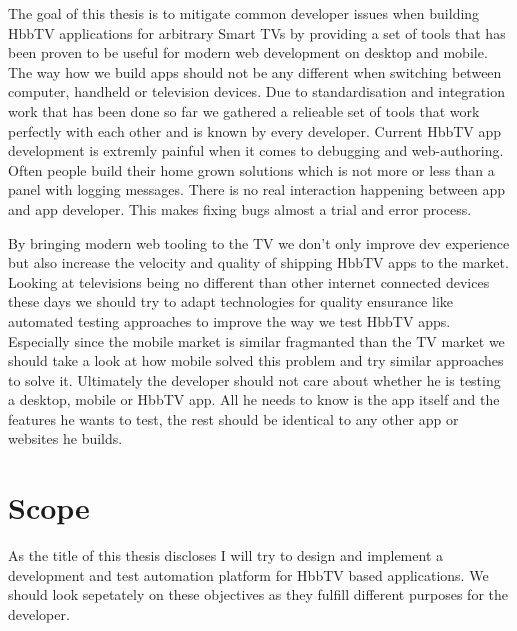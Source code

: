 The goal of this thesis is to mitigate common developer issues when building HbbTV applications for arbitrary
Smart TVs by providing a set of tools that has been proven to be useful for modern web development on desktop
and mobile. The way how we build apps should not be any different when switching between computer, handheld or
television devices. Due to standardisation and integration work that has been done so far we gathered a relieable
set of tools that work perfectly with each other and is known by every developer. Current HbbTV app development
is extremly painful when it comes to debugging and web-authoring. Often people build their home grown solutions
which is not more or less than a panel with logging messages. There is no real interaction happening between app
and app developer. This makes fixing bugs almost a trial and error process.

By bringing modern web tooling to the TV we don't only improve dev experience but also increase the velocity
and quality of shipping HbbTV apps to the market. Looking at televisions being no different than other internet
connected devices these days we should try to adapt technologies for quality ensurance like automated testing
approaches to improve the way we test HbbTV apps. Especially since the mobile market is similar fragmanted
than the TV market we should take a look at how mobile solved this problem and try similar approaches to solve
it. Ultimately the developer should not care about whether he is testing a desktop, mobile or HbbTV app. All
he needs to know is the app itself and the features he wants to test, the rest should be identical to any other
app or websites he builds.

\section{Scope\label{sec:scope}}

As the title of this thesis discloses I will try to design and implement a development and test automation
platform for HbbTV based applications. We should look sepetately on these objectives as they fulfill different
purposes for the developer.

